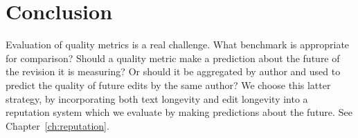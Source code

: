 \section{Conclusion}

Evaluation of quality metrics is a real challenge.
What benchmark is appropriate for comparison?
Should a quality metric make a prediction about
the future of the revision it is measuring?
Or should it be aggregated by author and used
to predict the quality of future edits by the
same author?
We choose this latter strategy, by incorporating
both text longevity and edit longevity into a reputation
system which we evaluate by making predictions about the
future.
See Chapter~\ref{ch:reputation}.
